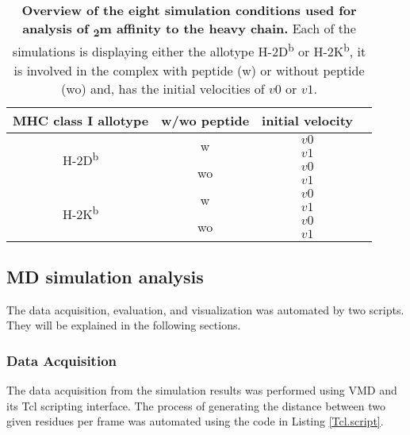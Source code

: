 \documentclass[11pt,twocolumn]{article}
\newcommand{\db}{H-2D\textsuperscript{b}\xspace}
\newcommand{\kb}{H-2K\textsuperscript{b}\xspace}
\newcommand{\btm}{\textbeta\textsubscript{2}m\xspace}
\begin{document}
\begin{table}[H]
\caption{\textbf{Overview of the eight simulation conditions used for analysis of \btm affinity to the heavy chain.} Each of the simulations is displaying either the allotype \db or \kb, it is involved in the complex with peptide (w) or without peptide (wo) and, has the initial velocities of $v0$ or $v1$.}
\label{simulations}
\centering 
\resizebox{0.4\textwidth}{!} {
\begin{tabular}{|c|c|c|c|}  \hline
MHC class I allotype& w/wo peptide&initial velocity\\ \hline
\multirow{4}{*}{\db}&\multirow{2}{*}{w}&$v0$\\
\cline{3-3} 
&&$v1$\\
\cline{2-3} 
&\multirow{2}{*}{wo}&$v0$\\
\cline{3-3} 
&&$v1$\\
\hline
\multirow{4}{*}{\kb}&\multirow{2}{*}{w}&$v0$\\
\cline{3-3} 
&&$v1$\\
\cline{2-3} 
&\multirow{2}{*}{wo}&$v0$\\
\cline{3-3} 
&&$v1$\\
\hline

\end{tabular}
}
\end{table}

\subsection*{MD simulation analysis}

The data acquisition, evaluation, and visualization was automated by two scripts. They will be explained in the following  sections.

\subsubsection*{Data Acquisition}

The data acquisition from  the simulation results was performed using VMD and its Tcl scripting interface. The process of generating the distance between two given residues per frame was automated using the code in Listing \ref{Tcl.script}.
\end{document}
